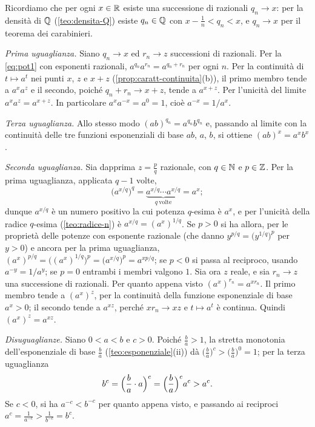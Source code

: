 \begin{dimostrazione}
Ricordiamo che per ogni $x\in\mathbb{R}$ esiste una successione di razionali $q_{n}\to x$: per
la densità di $\mathbb{Q}$ (\cref{teo:densita-Q}) esiste $q_{n}\in\mathbb{Q}$ con $x-\frac1n<q_{n}<x$, e
$q_{n}\to x$ per il teorema dei carabinieri.

\emph{Prima uguaglianza.} Siano $q_{n}\to x$ ed $r_{n}\to z$ successioni di razionali.
Per la \eqref{eq:pot1} con esponenti razionali, $a^{q_{n}}a^{r_{n}}=a^{q_{n}+r_{n}}$ per
ogni $n$. Per la continuità di $t\mapsto a^{t}$ nei punti $x$, $z$ e $x+z$
(\cref{prop:caratt-continuita}(b)), il primo membro tende a $a^{x}a^{z}$ e il secondo,
poiché $q_{n}+r_{n}\to x+z$, tende a $a^{x+z}$. Per l'unicità del limite
$a^{x}a^{z}=a^{x+z}$. In particolare $a^{x}a^{-x}=a^{0}=1$, cioè $a^{-x}=1/a^{x}$.

\emph{Terza uguaglianza.} Allo stesso modo $(ab)^{q_{n}}=a^{q_{n}}b^{q_{n}}$ e, passando al
limite con la continuità delle tre funzioni esponenziali di base $ab$, $a$, $b$, si
ottiene $(ab)^{x}=a^{x}b^{x}$.

\emph{Seconda uguaglianza.} Sia dapprima $z=\frac pq$ razionale, con $q\in\mathbb{N}$ e
$p\in\mathbb{Z}$. Per la prima uguaglianza, applicata $q-1$ volte,
\[
  \bigl(a^{x/q}\bigr)^{q}=\underbrace{a^{x/q}\cdots a^{x/q}}_{q\ \text{volte}}=a^{x};
\]
dunque $a^{x/q}$ è un numero positivo la cui potenza $q$-esima è $a^{x}$, e per l'unicità
della radice $q$-esima (\cref{teo:radice-n}) è $a^{x/q}=(a^{x})^{1/q}$. Se $p>0$ si ha
allora, per le proprietà delle potenze con esponente razionale (che danno
$y^{p/q}=\bigl(y^{1/q}\bigr)^{p}$ per $y>0$) e ancora per la prima uguaglianza,
$(a^{x})^{p/q}=\bigl((a^{x})^{1/q}\bigr)^{p}=\bigl(a^{x/q}\bigr)^{p}=a^{xp/q}$; se $p<0$ si
passa al reciproco, usando $a^{-y}=1/a^{y}$; se $p=0$ entrambi i membri valgono $1$.
Sia ora $z$ reale, e sia $r_{n}\to z$ una successione di razionali. Per quanto appena
visto $(a^{x})^{r_{n}}=a^{xr_{n}}$. Il primo membro tende a $(a^{x})^{z}$, per la
continuità della funzione esponenziale di base $a^{x}>0$; il secondo tende a $a^{xz}$,
perché $xr_{n}\to xz$ e $t\mapsto a^{t}$ è continua. Quindi $(a^{x})^{z}=a^{xz}$.

\emph{Disuguaglianze.} Siano $0<a<b$ e $c>0$. Poiché $\frac ba>1$, la stretta monotonia
dell'esponenziale di base $\frac ba$ (\cref{teo:esponenziale}(ii)) dà
$\bigl(\frac ba\bigr)^{c}>\bigl(\frac ba\bigr)^{0}=1$; per la terza uguaglianza
\[
  b^{c}=\Bigl(\frac ba\cdot a\Bigr)^{c}=\Bigl(\frac ba\Bigr)^{c}a^{c}>a^{c} .
\]
Se $c<0$, si ha $a^{-c}<b^{-c}$ per quanto appena visto, e passando ai reciproci
$a^{c}=\frac1{a^{-c}}>\frac1{b^{-c}}=b^{c}$.
\end{dimostrazione}

